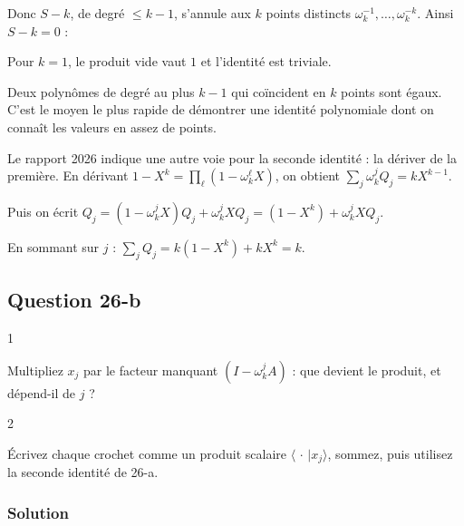 \documentclass[11pt,a4paper]{article}
\newcommand{\equationajustee}[1]{%
  \sbox{\boiteequation}{$\displaystyle #1$}%
  \ifdim\wd\boiteequation>\linewidth
    \[\resizebox{\linewidth}{!}{\usebox{\boiteequation}}\]%
  \else
    \[#1\]%
  \fi}
\begin{document}
Donc \(S-k\), de degré \(\le k-1\), s'annule aux \(k\) points distincts \(\omega_k^{-1},\dots,\omega_k^{-k}\). Ainsi \(S-k=0\) :

\equationajustee{\boxed{1=\frac1k\sum_{j=1}^k\prod_{\substack{\ell=1\\ \ell\neq j}}^k(1-\omega_k^\ell X)}}

Pour \(k=1\), le produit vide vaut \(1\) et l'identité est triviale.

\begin{methode}

Deux polynômes de degré au plus \(k-1\) qui coïncident en \(k\) points sont égaux. C'est le moyen le plus rapide de démontrer une identité polynomiale dont on connaît les valeurs en assez de points.

\end{methode}

\begin{methode}

Le rapport 2026 indique une autre voie pour la seconde identité : la dériver de la première. En dérivant \(1-X^k=\prod_\ell(1-\omega_k^\ell X)\), on obtient \(\sum_j\omega_k^jQ_j=kX^{k-1}\).

Puis on écrit \(Q_j=(1-\omega_k^jX)Q_j+\omega_k^jXQ_j=(1-X^k)+\omega_k^jXQ_j\).

En sommant sur \(j\) : \(\sum_jQ_j=k(1-X^k)+kX^k=k\).

\end{methode}

\hypertarget{question-26-b}{%
\subsection{Question 26-b}\label{question-26-b}}

\begin{indication}{1}

Multipliez \(x_j\) par le facteur manquant \((I-\omega_k^jA)\) : que devient le produit, et dépend-il de \(j\) ?

\end{indication}

\begin{indication}{2}

Écrivez chaque crochet comme un produit scalaire \(\langle\,\cdot\,|x_j\rangle\), sommez, puis utilisez la seconde identité de 26-a.

\end{indication}

\hypertarget{solution-26}{%
\subsubsection{Solution}\label{solution-26}}
\end{document}
